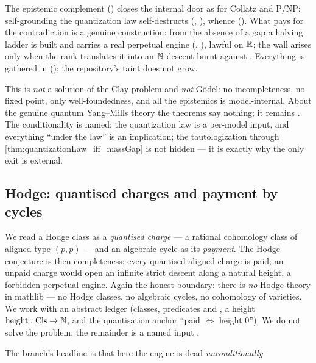 The epistemic complement () closes the internal door as for
Collatz and P/NP: self-grounding the quantization law self-destructs
(, \green{}), whence  (\green{}). What pays
for the contradiction is a genuine construction: from the absence of a gap a halving ladder is built
and carries a real perpetual engine (, \green{}), lawful on
$\mathbb{R}$; the wall arises only when the rank translates it into an $\mathbb{N}$-descent burnt against
. Everything is gathered in
 (\green{}); the repository's taint does not grow.

\begin{remark}
This is \emph{not} a solution of the Clay problem and \emph{not} G\"odel: no incompleteness, no fixed
point, only well-foundedness, and all the epistemics is model-internal. About the genuine quantum
Yang--Mills theory the theorems say nothing; it remains \red{}. The conditionality is named: the
quantization law is a \red{} per-model input, and everything ``under the law'' is an implication;
the tautologization through \cref{thm:quantizationLaw_iff_massGap} is not hidden --- it is exactly
why the only exit is external.
\end{remark}

\subsection{Hodge: quantised charges and payment by cycles}

We read a Hodge class as a \emph{quantised charge} --- a rational cohomology class of aligned type
$(p,p)$ --- and an algebraic cycle as its \emph{payment}. The Hodge conjecture is then completeness:
every quantised aligned charge is paid; an unpaid charge would open an infinite strict descent along
a natural height, a forbidden perpetual engine. Again the honest boundary: there is \emph{no} Hodge
theory in mathlib --- no Hodge classes, no algebraic cycles, no cohomology of varieties. We work
with an abstract ledger  (classes, predicates  and ,
a height $\mathrm{height}:\mathrm{Cls}\to\mathbb{N}$, and the quantisation anchor ``paid $\iff$ height $0$'').
We do not solve the problem; the remainder is a named input .

The branch's headline is that here the engine is dead \emph{unconditionally}.


